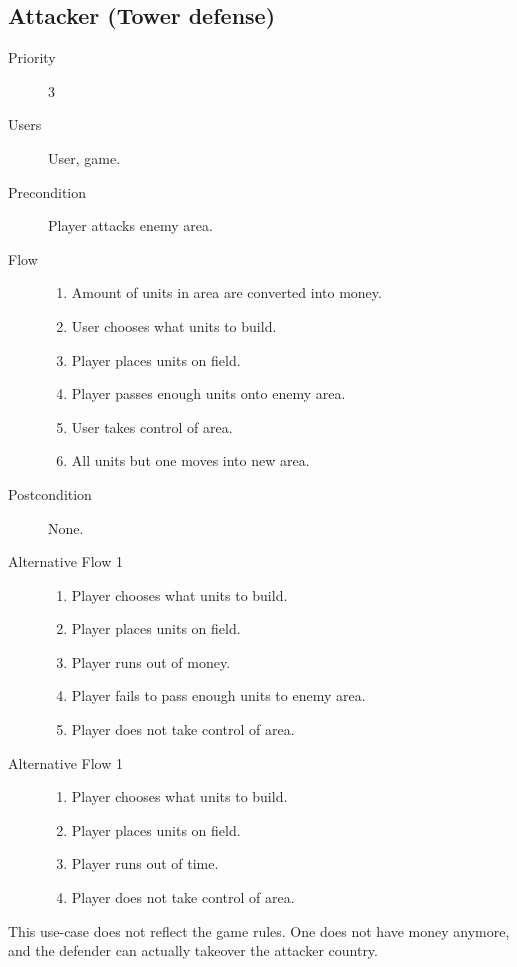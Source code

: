 \documentclass[12pt,a4paper]{article}
\begin{document}
\subsection{Attacker (Tower defense)}

\begin{description}
\item[Priority] 3
\item[Users]  User, game.
\item[Precondition] Player attacks enemy area.
\item[Flow]\mbox{}
  \begin{enumerate}
  \item Amount of units in area are converted into money.
  \item User chooses what units to build.
  \item Player places units on field.
  \item Player passes enough units onto enemy area.
  \item User takes control of area.
  \item All units but one moves into new area.
  \end{enumerate}
\item[Postcondition] None.
\item[Alternative Flow 1]\mbox{}
  \begin{enumerate}
  \item Player chooses what units to build.
  \item Player places units on field.
  \item Player runs out of money.
  \item Player fails to pass enough units to enemy area.
  \item Player does not take control of area.
  \end{enumerate}
\item[Alternative Flow 1]\mbox{}
  \begin{enumerate}
  \item Player chooses what units to build.
  \item Player places units on field.
  \item Player runs out of time.
  \item Player does not take control of area.
  \end{enumerate}
\end{description}

\begin{todo}
  This use-case does not reflect the game rules. One does not have money
  anymore, and the defender can actually takeover the attacker country.
\end{todo}
\end{document}

